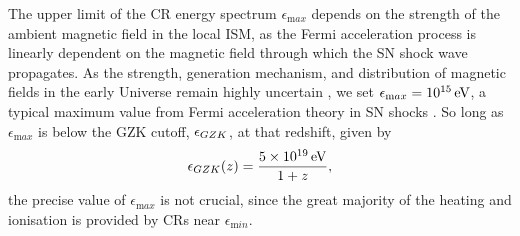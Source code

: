 \documentclass[../thesis.tex]{subfiles}
\begin{document}
The upper limit of the CR energy spectrum $\epsilon_{\mathrm max}$ depends on the strength of the ambient magnetic field in the local ISM, as the Fermi acceleration process is linearly dependent on the magnetic field through which the SN shock wave propagates. 
As the strength, generation mechanism, and distribution of magnetic fields in the early Universe remain highly uncertain \citep{DurrerNeronov2013}, we set $\epsilon_{\mathrm max} = 10^{15}\,\mathrm{eV}$, a typical maximum value from Fermi acceleration theory in SN shocks \citep[e.g.,][]{BlandfordEichler1987}.  
So long as $\epsilon_{\mathrm max}$ is below the GZK cutoff, $\epsilon_{\mathrm \small GZK}$, at that redshift, given by \citep{StacyBromm2007}
\begin{equation}
\epsilon_{\mathrm \small GZK}(z) = \frac{5\times10^{19}\,\mathrm{eV}}{1+z},
\end{equation}
the precise value of $\epsilon_{\mathrm max}$ is not crucial, since the great majority of the heating and ionisation is provided by CRs near $\epsilon_{\mathrm min}$.
\end{document}
